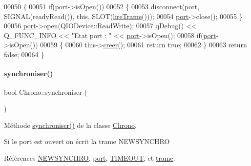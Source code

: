 \begin{DoxyCode}
00050 \{
00051     \textcolor{keywordflow}{if}(\hyperlink{class_chrono_aca5fbe0eebd7f876f954d4a99c564167}{port}->isOpen())
00052     \{
00053         disconnect(\hyperlink{class_chrono_aca5fbe0eebd7f876f954d4a99c564167}{port}, SIGNAL(readyRead()), \textcolor{keyword}{this}, SLOT(\hyperlink{class_chrono_ae7c3c8494ace02f4c9dd714f6f0e574a}{lireTrame}()));
00054         \hyperlink{class_chrono_aca5fbe0eebd7f876f954d4a99c564167}{port}->close();
00055     \}
00056     \hyperlink{class_chrono_aca5fbe0eebd7f876f954d4a99c564167}{port}->open(QIODevice::ReadWrite);
00057     qDebug() << Q\_FUNC\_INFO << \textcolor{stringliteral}{"Etat port : "} << \hyperlink{class_chrono_aca5fbe0eebd7f876f954d4a99c564167}{port}->isOpen();
00058     \textcolor{keywordflow}{if}(\hyperlink{class_chrono_aca5fbe0eebd7f876f954d4a99c564167}{port}->isOpen())
00059     \{
00060         this->\hyperlink{class_chrono_a74d85a4e856e2e59afacaa061feb7b75}{creer}();
00061         \textcolor{keywordflow}{return} \textcolor{keyword}{true};
00062     \}
00063     \textcolor{keywordflow}{return} \textcolor{keyword}{false};
00064 \}
\end{DoxyCode}
\mbox{\label{class_chrono_a858a209a6d366b3adb95bcf593645d6a}} 
\paragraph{\texorpdfstring{synchroniser()}{synchroniser()}}
{\footnotesize\ttfamily bool Chrono\+::synchroniser (\begin{DoxyParamCaption}{ }\end{DoxyParamCaption})}



Méthode \hyperlink{class_chrono_a858a209a6d366b3adb95bcf593645d6a}{synchroniser()} de la classe \hyperlink{class_chrono}{Chrono}. 

Si le port est ouvert on écrit la trame N\+E\+W\+S\+Y\+N\+C\+H\+RO 

Références \hyperlink{chrono_8h_a6fd2c46c463ee5bf46edf6f117c277ec}{N\+E\+W\+S\+Y\+N\+C\+H\+RO}, \hyperlink{class_chrono_aca5fbe0eebd7f876f954d4a99c564167}{port}, \hyperlink{chrono_8h_a45ba202b05caf39795aeca91b0ae547e}{T\+I\+M\+E\+O\+UT}, et \hyperlink{class_chrono_a26f2155aa6e5ef4296e5456b64a713b5}{trame}.



